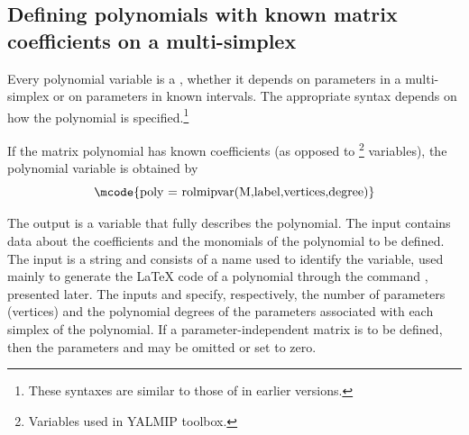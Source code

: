 \documentclass[english,11pt]{article}
\theoremstyle{break} \theorembodyfont{\small\rm}
\begin{document}
\subsection{Defining polynomials with known matrix coefficients on a multi-simplex}

Every polynomial variable is a , whether it depends on
parameters in a multi-simplex or on parameters in known intervals. The
appropriate syntax depends on how the polynomial is specified.\footnote{These
syntaxes are similar to those of  in earlier versions.}

If the matrix polynomial has known coefficients (as opposed to \footnote{Variables used
in YALMIP toolbox.} variables), the
polynomial variable is obtained by
\[
\mbox{\mcode{poly = rolmipvar(M,label,vertices,degree)}}
\]

The output  is a  variable that fully describes the polynomial.
The input  contains data about the coefficients and the monomials of the
polynomial to be defined.
The input  is a string and consists of a name used to identify the
variable, used mainly to generate the {\LaTeX} code of a polynomial through the command , presented later.
The inputs  and  specify, respectively, the number
of parameters (vertices) and the polynomial degrees of the parameters associated with each simplex of the polynomial. If a parameter-independent
matrix is to be defined, then the parameters  and  may be omitted
or set to zero.
\end{document}
